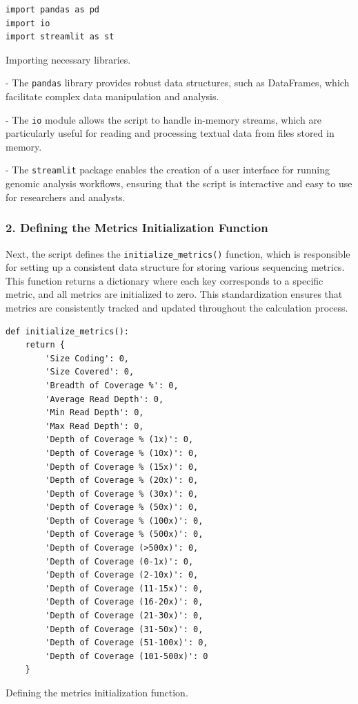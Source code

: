 \begin{longlisting}
\begin{verbatim}
import pandas as pd
import io
import streamlit as st
\end{verbatim}
\caption{Importing necessary libraries.}
\label{lbl:metrics_import}
\end{longlisting}

- The \texttt{pandas} library provides robust data structures, such as DataFrames, which facilitate complex data manipulation and analysis.

- The \texttt{io} module allows the script to handle in-memory streams, which are particularly useful for reading and processing textual data from files stored in memory.

- The \texttt{streamlit} package enables the creation of a user interface for running genomic analysis workflows, ensuring that the script is interactive and easy to use for researchers and analysts.

\subsubsection{2. Defining the Metrics Initialization Function}

Next, the script defines the \texttt{initialize\_metrics()} function, which is responsible for setting up a consistent data structure for storing various sequencing metrics. This function returns a dictionary where each key corresponds to a specific metric, and all metrics are initialized to zero. This standardization ensures that metrics are consistently tracked and updated throughout the calculation process.

\begin{longlisting}
\begin{verbatim}
def initialize_metrics():
    return {
        'Size Coding': 0,
        'Size Covered': 0,
        'Breadth of Coverage %': 0,
        'Average Read Depth': 0,
        'Min Read Depth': 0,
        'Max Read Depth': 0,
        'Depth of Coverage % (1x)': 0,
        'Depth of Coverage % (10x)': 0,
        'Depth of Coverage % (15x)': 0,
        'Depth of Coverage % (20x)': 0,
        'Depth of Coverage % (30x)': 0,
        'Depth of Coverage % (50x)': 0,
        'Depth of Coverage % (100x)': 0,
        'Depth of Coverage % (500x)': 0,
        'Depth of Coverage (>500x)': 0,
        'Depth of Coverage (0-1x)': 0,
        'Depth of Coverage (2-10x)': 0,
        'Depth of Coverage (11-15x)': 0,
        'Depth of Coverage (16-20x)': 0,
        'Depth of Coverage (21-30x)': 0,
        'Depth of Coverage (31-50x)': 0,
        'Depth of Coverage (51-100x)': 0,
        'Depth of Coverage (101-500x)': 0
    }
\end{verbatim}
\caption{Defining the metrics initialization function.}
\label{lbl:metrics_init}
\end{longlisting}


